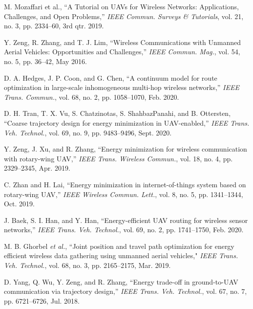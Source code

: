 \documentclass[journal]{IEEEtran}
\begin{document}
\balance


\begin{thebibliography}{1}
	
		   {M. Mozaffari et al., “A Tutorial on UAVs for Wireless Networks: Applications, Challenges, and Open Problems,” \emph{IEEE
	Commun. Surveys \& Tutorials}, vol. 21, no. 3, pp. 2334–60, 3rd qtr. 2019.}
	
	  {Y. Zeng, R. Zhang, and T. J. Lim, “Wireless Communications
	with Unmanned Aerial Vehicles: Opportunities and Challenges,” \emph{IEEE Commun. Mag.}, vol. 54, no. 5, pp. 36–42, May 2016.}
	

         D. A. Hedges, J. P. Coon, and G. Chen, ``A continuum model for route optimization in large-scale inhomogeneous multi-hop wireless networks,'' \emph{IEEE Trans. Commun.}, vol. 68, no. 2, pp. 1058--1070, Feb. 2020.
		
		
      
		 
		 
		 {D. H. Tran, T. X. Vu, S. Chatzinotas, S. ShahbazPanahi, and B. Ottersten, ``Coarse trajectory design for energy minimization in UAV-enabled,'' \emph{IEEE Trans. Veh. Technol.}, vol. 69, no. 9, pp. 9483--9496, Sept. 2020.}
		
		
		 {Y. Zeng, J. Xu, and R. Zhang, ``Energy minimization for wireless communication with rotary-wing UAV,'' \emph{IEEE Trans. Wireless Commun.}, vol. 18, no. 4, pp. 2329--2345, Apr. 2019.}
		
		

		
		
		 {C. Zhan and H. Lai, ``Energy minimization in internet-of-things system based on rotary-wing UAV,'' \emph{IEEE Wireless Commun. Lett.}, vol. 8, no. 5, pp. 1341--1344, Oct. 2019.}
		
		
		
		
		  {J. Baek, S. I. Han, and Y. Han, ``Energy-efficient UAV routing for wireless sensor networks,'' \emph{IEEE Trans. Veh. Technol.}, vol. 69, no. 2, pp. 1741--1750, Feb. 2020.}
		
		
		 M. B. Ghorbel \emph{et al.}, ``Joint position and travel path optimization for energy efficient wireless data gathering using unmanned aerial vehicles," \emph{IEEE Trans. Veh. Technol.}, vol. 68, no. 3, pp. 2165--2175, Mar. 2019.
		

		
		 {D. Yang, Q. Wu, Y. Zeng, and R. Zhang, ``Energy trade-off in ground-to-UAV communication via trajectory design,'' \emph{IEEE Trans. Veh. Technol.}, vol. 67, no. 7, pp. 6721--6726, Jul. 2018.}
		

\end{thebibliography}
\end{document}
